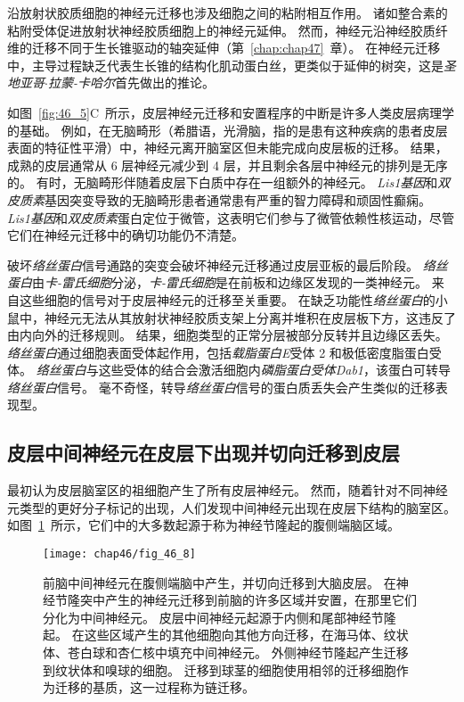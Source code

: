 沿放射状胶质细胞的神经元迁移也涉及细胞之间的粘附相互作用。
诸如整合素的粘附受体促进放射状神经胶质细胞上的神经元延伸。
然而，神经元沿神经胶质纤维的迁移不同于生长锥驱动的轴突延伸（第~\ref{chap:chap47}~章）。
在神经元迁移中，主导过程缺乏代表生长锥的结构化肌动蛋白丝，更类似于延伸的树突，这是\textit{圣地亚哥$\cdot$拉蒙-卡哈尔}首先做出的推论。


如图~\ref{fig:46_5}C~所示，皮层神经元迁移和安置程序的中断是许多人类皮层病理学的基础。
例如，在无脑畸形（希腊语，光滑脑，指的是患有这种疾病的患者皮层表面的特征性平滑）中，神经元离开脑室区但未能完成向皮层板的迁移。
结果，成熟的皮层通常从 6 层神经元减少到 4 层，并且剩余各层中神经元的排列是无序的。
有时，无脑畸形伴随着皮层下白质中存在一组额外的神经元。
\textit{Lis1基因}和\textit{双皮质素}基因突变导致的无脑畸形患者通常患有严重的智力障碍和顽固性癫痫。
\textit{Lis1基因}和\textit{双皮质素}蛋白定位于微管，这表明它们参与了微管依赖性核运动，尽管它们在神经元迁移中的确切功能仍不清楚。


破坏\textit{络丝蛋白}信号通路的突变会破坏神经元迁移通过皮层亚板的最后阶段。
\textit{络丝蛋白}由\textit{卡-雷氏细胞}分泌，\textit{卡-雷氏细胞}是在前板和边缘区发现的一类神经元。
来自这些细胞的信号对于皮层神经元的迁移至关重要。
在缺乏功能性\textit{络丝蛋白}的小鼠中，神经元无法从其放射状神经胶质支架上分离并堆积在皮层板下方，这违反了由内向外的迁移规则。
结果，细胞类型的正常分层被部分反转并且边缘区丢失。
\textit{络丝蛋白}通过细胞表面受体起作用，包括\textit{载脂蛋白E}受体 2 和极低密度脂蛋白受体。
\textit{络丝蛋白}与这些受体的结合会激活细胞内\textit{磷脂蛋白受体Dab1}，该蛋白可转导\textit{络丝蛋白}信号。
毫不奇怪，转导\textit{络丝蛋白}信号的蛋白质丢失会产生类似的迁移表现型。



\subsection{皮层中间神经元在皮层下出现并切向迁移到皮层}

最初认为皮层脑室区的祖细胞产生了所有皮层神经元。
然而，随着针对不同神经元类型的更好分子标记的出现，人们发现中间神经元出现在皮层下结构的脑室区。
如图~\ref{fig:46_8}~所示，它们中的大多数起源于称为神经节隆起的腹侧端脑区域。


\begin{figure}[htbp]
	\centering
	\texttt{[image: chap46/fig\_46\_8]}
	\caption{前脑中间神经元在腹侧端脑中产生，并切向迁移到大脑皮层。
		在神经节隆突中产生的神经元迁移到前脑的许多区域并安置，在那里它们分化为中间神经元。
		皮层中间神经元起源于内侧和尾部神经节隆起。
		在这些区域产生的其他细胞向其他方向迁移，在海马体、纹状体、苍白球和杏仁核中填充中间神经元。
		外侧神经节隆起产生迁移到纹状体和嗅球的细胞。
		迁移到球茎的细胞使用相邻的迁移细胞作为迁移的基质，这一过程称为链迁移\cite{bandler2017cortical}。}
	\label{fig:46_8}
\end{figure}



